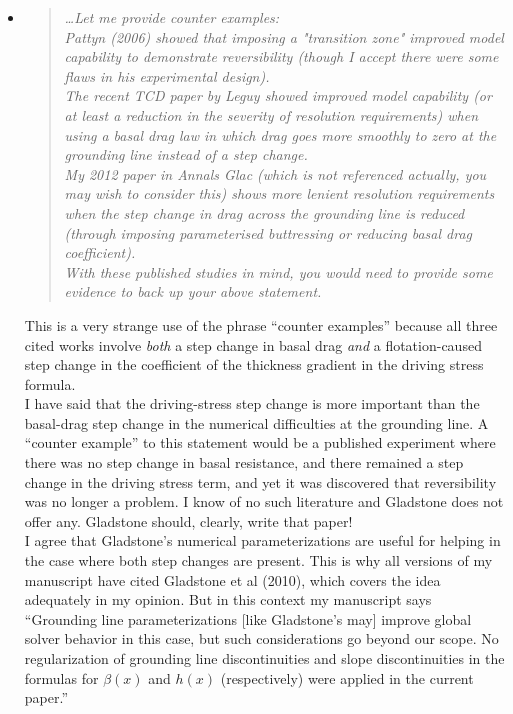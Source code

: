 \documentclass[11pt,reqno]{amsart}
\newcommand{\reply}[2]{
\medskip\medskip
\item  \begin{quote}
\emph{#1}
\end{quote}

\medskip
\noindent #2}
\begin{document}
\begin{itemize}
\reply{\dots Let me provide counter examples: \medskip \\
Pattyn (2006) showed that imposing a "transition zone" improved model capability to demonstrate reversibility (though I accept there were some flaws in his experimental design). \medskip \\
The recent TCD paper by Leguy showed improved model capability (or at least a reduction in the severity of resolution requirements) when using a basal drag law in which drag goes more smoothly to zero at the grounding line instead of a step change. \medskip \\
My 2012 paper in Annals Glac (which is not referenced actually, you may wish to consider this) shows more lenient resolution requirements when the step change in drag across the grounding line is reduced (through imposing parameterised buttressing or reducing basal drag coefficient). \medskip \\
With these published studies in mind, you would need to provide some evidence to back up your above statement.}{This is a very strange use of the phrase ``counter examples'' because all three cited works involve \emph{both} a step change in basal drag \emph{and} a flotation-caused step change in the coefficient of the thickness gradient in the driving stress formula.\medskip \\
I have said that the driving-stress step change is more important than the basal-drag step change in the numerical difficulties at the grounding line.  A ``counter example'' to this statement would be a published experiment where there was no step change in basal resistance, and there remained a step change in the driving stress term, and yet it was discovered that reversibility was no longer a problem.  I know of no such literature and Gladstone does not offer any.  Gladstone should, clearly, write that paper! \medskip \\
I agree that Gladstone's numerical parameterizations are useful for helping in the case where both step changes are present.  This is why all versions of my manuscript have cited Gladstone et al (2010), which covers the idea adequately in my opinion.  But in this context my manuscript says ``Grounding line parameterizations [like Gladstone's may] improve global solver behavior in this case, but such considerations go beyond our scope.  No regularization of grounding line discontinuities and slope discontinuities in the formulas for $\beta(x)$ and $h(x)$ (respectively) were applied in the current paper.'' \medskip \\
}
\end{itemize}
\end{document}
